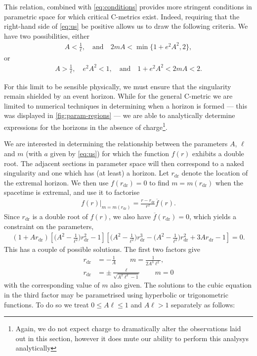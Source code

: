 \documentclass[
twoside,
openright,
frontopenright
]{dmathesis}
\newcommand{\nn}{\nonumber}
\newcommand{\dr}{\mathrm{dr}}
\begin{document}
This relation, combined with \cref{eq:conditions} provides more stringent
conditions in parametric space for which critical C-metrics exist. Indeed,
requiring that the right-hand side of \cref{eq:us} be positive allows us to draw
the following criteria. We have two possibilities, either
\begin{align}\label{eq:case1}
A<\frac{1}{\ell},\quad \mbox{and}\quad 2mA<\min \{1+e^2A^2,2\},
\end{align}
or
\begin{align}\label{eq:case2}
A>\frac{1}{\ell}, \quad e^2A^2<1, \quad \mbox{and} \quad 1+e^2A^2<2mA<2.
\end{align}

For this limit to be sensible physically, we must ensure that the singularity
remain shielded by an event horizon. While for the general C-metric we are
limited to numerical techniques in determining when a horizon is formed --- this
was displayed in \cref{fig:param-regions} --- we are able to analytically
determine expressions for the horizons in the absence of charge\footnote{Again,
  we do not expect charge to dramatically alter the observations laid out in
  this section, however it does mute our ability to perform this analysys
  analytically}.

We are interested in determining the relationship between the parameters $A$,
$\ell$ and $m$ (with $a$ given by \cref{eq:us}) for which the function $f(r)$
exhibits a double root. The adjacent sections in parameter space will then
correspond to a naked singularity and one which has (at least) a horizon. Let
$r_\dr$ denote the location of the extremal horizon. We then use $f(r_\dr)=0$ to
find $m=m(r_\dr)$ when the spacetime is extremal, and use it to factorise
\begin{align}
f(r)\big|_{m=m(r_\dr)}=\frac{r-r_\dr}{r^2}\overline{f}(r).
\end{align}
Since $r_\dr$ is a double root of $f(r)$, we also have $\overline{f}(r_\dr)=0$,
which yields a constraint on the parameters,
\begin{align}
 (1+Ar_\dr)\left[\Big(A^{2}-\frac{1}{\ell^2}\Big)r_\dr^2-1\right]\left[\Big(A^2-\frac{1}{\ell^2}\Big)r_\dr^3-\Big(A^2-\frac{1}{\ell^2}\Big)r_\dr^2+3Ar_\dr-1\right]=0.
\end{align}
This has a couple of possible solutions. The first two factors give
\begin{align}
r_\dr &=- \frac{1}{A} \qquad m = \frac{1}{2A^3\ell^2},\nn\\
r_\dr &= \pm\frac{\ell}{\sqrt{A^2\ell^2-1}}\qquad m =0
\end{align}
with the corresponding value of $m$ also given. The solutions to the cubic
equation in the third factor may be parametrised using hyperbolic or
trigonometric functions. To do so we treat $0\leqslant A\ell\leqslant 1$ and
$A\ell>1$ separately as follows:
\end{document}
